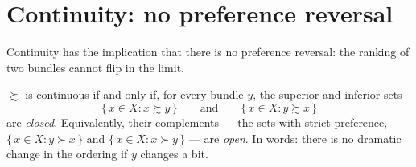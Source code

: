 \documentclass[11pt]{article}
\begin{document}


\section{Continuity: no preference reversal}

Continuity has the implication that there is no preference reversal: the ranking
of two bundles cannot flip in the limit.

$\succsim$ is continuous if and only if, for every bundle $y$, the superior and
inferior sets
\[ \{\,x\in X : x\succsim y\,\}\qquad\text{and}\qquad \{\,x\in X : y\succsim x\,\} \]
are \emph{closed}. Equivalently, their complements --- the sets with strict
preference, $\{\,x\in X : y\succ x\,\}$ and $\{\,x\in X : x\succ y\,\}$ --- are
\emph{open}. In words: there is no dramatic change in the ordering if $y$ changes
a bit.
\end{document}
